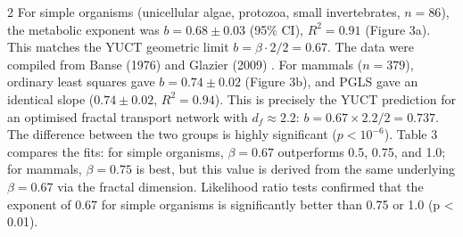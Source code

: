 \documentclass[11pt,a4paper]{article}
\newcommand{\betaf}{\beta}
\newcommand{\df}{d_f}
\begin{document}
\begin{multicols}{2}
		For simple organisms (unicellular algae, protozoa, small invertebrates, \(n = 86\)), the metabolic exponent was \(b = 0.68 \pm 0.03\) (95\% CI), \(R^2 = 0.91\) (Figure 3a). This matches the YUCT geometric limit \(b = \betaf \cdot 2/2 = 0.67\). The data were compiled from Banse (1976) \cite{Banse1976} and Glazier (2009) \cite{Glazier2009}. For mammals (\(n = 379\)), ordinary least squares gave \(b = 0.74 \pm 0.02\) (Figure 3b), and PGLS gave an identical slope (\(0.74 \pm 0.02\), \(R^2 = 0.94\)). This is precisely the YUCT prediction for an optimised fractal transport network with \(\df \approx 2.2\): \(b = 0.67 \times 2.2 / 2 = 0.737\). The difference between the two groups is highly significant (\(p < 10^{-6}\)). Table 3 compares the fits: for simple organisms, \(\beta = 0.67\) outperforms 0.5, 0.75, and 1.0; for mammals, \(\beta = 0.75\) is best, but this value is derived from the same underlying \(\beta = 0.67\) via the fractal dimension. Likelihood ratio tests confirmed that the exponent of 0.67 for simple organisms is significantly better than 0.75 or 1.0 (p < 0.01).
		

\end{multicols}
\end{document}

